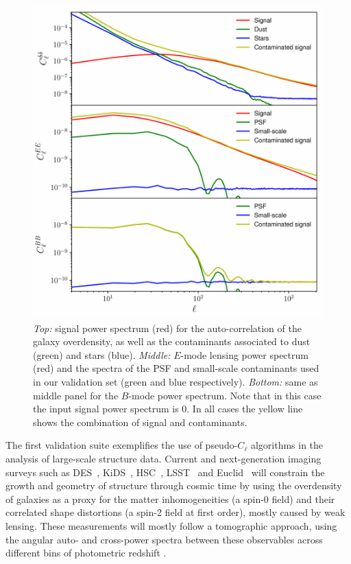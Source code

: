 \documentclass[usenatbib]{mnrasb}
\begin{document}
        \begin{figure}
          \centering
          \includegraphics[width=0.99\columnwidth]{cls_cont_lss}
          \caption{{\sl Top:} signal power spectrum (red) for the auto-correlation of the galaxy overdensity, as well as the contaminants associated to dust (green) and stars (blue). {\sl Middle:} $E$-mode lensing power spectrum (red) and the spectra of the PSF and small-scale contaminants used in our validation set (green and blue respectively). {\sl Bottom:} same as middle panel for the $B$-mode power spectrum. Note that in this case the input signal power spectrum is $0$. In all cases the yellow line shows the combination of signal and contaminants.} \label{fig:lss_cont_cls}
        \end{figure}
        The first validation suite exemplifies the use of pseudo-$C_\ell$ algorithms in the analysis of large-scale structure data. Current and next-generation imaging surveys such as DES~\citep{2016MNRAS.460.1270D},
        KiDS~\citep{2017A&A...604A.134D}, HSC~\citep{2018PASJ...70S...4A}, LSST~\citep{2008arXiv0805.2366I} and Euclid~\citep{2011arXiv1110.3193L} will constrain the growth and geometry of structure through cosmic time by using the overdensity of galaxies as a proxy for the matter inhomogeneities (a spin-0 field) and their correlated shape distortions (a spin-2 field at first order), mostly caused by weak lensing. These measurements will mostly follow a tomographic approach, using the angular auto- and cross-power spectra between these observables across different bins of photometric redshift \citep{2017arXiv170609359K,2018MNRAS.474.4894J,2017arXiv170801530D}.
        
\end{document}
